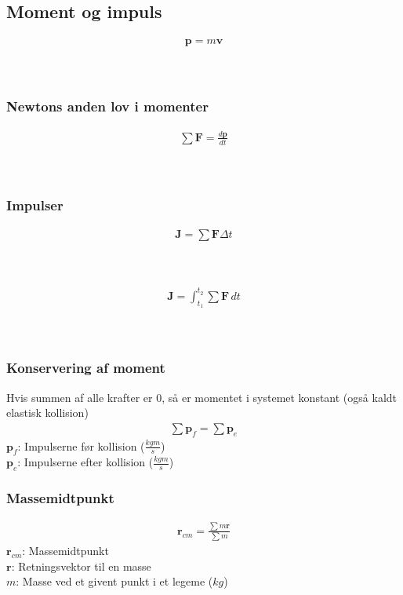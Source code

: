 \subsection{Moment og impuls}
	\begin{align}
		\mathbf{p}=m\mathbf{v}
	\end{align}
	\Moment\\
	\masse\\
	\Vel

	\subsubsection{Newtons anden lov i momenter}
		\begin{align}
			\sum\mathbf{F}=\frac{d\mathbf{p}}{dt}
		\end{align}
		\Kraft\\
		\Moment\\
		\tid
	
	\subsubsection{Impulser}
		\begin{align}
			\mathbf{J}=\sum\mathbf{F}\Delta t
		\end{align}
		\Impuls\\
		\Kraft\\
		\tid

		\begin{align}
			\mathbf{J}=\int_{t_1}^{t_2}\sum\mathbf{F}\,dt
		\end{align}
		\Impuls\\
		\Kraft\\
		\tid

	\subsubsection{Konservering af moment}
		Hvis summen af alle krafter er 0, så er momentet i systemet konstant (også kaldt elastisk kollision)
		\begin{align}
			\sum\mathbf{p}_f=\sum\mathbf{p}_e
		\end{align}
		$\mathbf{p}_f$: Impulserne før kollision ($\frac{kg m}{s}$)\\
		$\mathbf{p}_e$: Impulserne efter kollision ($\frac{kg m}{s}$)
	
	\subsubsection{Massemidtpunkt}
		\begin{align}
			\mathbf{r}_{cm}=\frac{\sum m\mathbf{r}}{\sum m}
		\end{align}
		$\mathbf{r}_{cm}$: Massemidtpunkt\\
		$\mathbf{r}$: Retningsvektor til en masse\\
		$m$: Masse ved et givent punkt i et legeme ($kg$)